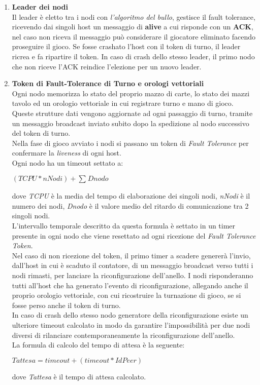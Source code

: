 \documentclass[10pt,a4paper]{article}
\begin{document}
\begin{enumerate}
\item \textbf{Leader dei nodi}\\ Il leader è eletto tra i nodi con \textit{l'algoritmo del bullo}, gestisce il fault tolerance, ricevendo dai singoli host un messaggio di \textbf{alive} a cui risponde con un \textbf{ACK}, nel caso non riceva il messaggio può considerare il giocatore eliminato facendo proseguire il gioco. Se fosse crashato l'host con il token di turno, il leader ricrea e fa ripartire il token. In caso di crash dello stesso leader, il primo nodo che non riceve l'ACK reindice l'elezione per un nuovo leader. 

\item \textbf{Token di Fault-Tolerance di Turno e orologi vettoriali}\\ Ogni nodo memorizza lo stato del proprio mazzo di carte, lo stato dei mazzi tavolo ed un orologio vettoriale in cui registrare turno e mano di gioco. Queste strutture dati vengono aggiornate ad ogni passaggio di turno, tramite un messaggio broadcast inviato subito dopo la spedizione al nodo successivo del token di turno.\\ Nella fase di gioco avviato i nodi si passano un token di \textit{Fault Tolerance} per confermare la \textit{liveness} di ogni host. \\ Ogni nodo ha un timeout settato a: \\\begin{center}$(TCPU*nNodi)+\sum_{}Dnodo$\end{center} dove \textit{TCPU} è la media del tempo di elaborazione dei singoli nodi, \textit{nNodi} è il numero dei nodi, \textit{Dnodo} è il valore medio del ritardo di comunicazione tra 2 singoli nodi.\\L'intervallo temporale descritto da questa formula è settato in un timer presente in ogni nodo che viene resettato ad ogni ricezione del \textit{Fault Tolerance Token}.\\ Nel caso di non ricezione del token, il primo timer a scadere genererà l'invio, dall'host in cui è scaduto il contatore, di un messaggio broadcast verso tutti i nodi rimasti, per lanciare la riconfigurazione dell'anello. I nodi risponderanno tutti all'host che ha generato l'evento di riconfigurazione, allegando anche il proprio orologio vettoriale, con cui ricostruire la turnazione di gioco, se si fosse perso anche il token di turno. \\ In caso di crash dello stesso nodo generatore della riconfigurazione esiste un ulteriore timeout calcolato in modo da garantire l'impossibilità per due nodi diversi di rilanciare contemporaneamente la riconfigurazione dell'anello.\\ La formula di calcolo del tempo di attesa è la seguente:\begin{center}$Tattesa = timeout +(timeout * IdPeer)$\end{center}dove \textit{Tattesa} è il tempo di attesa calcolato.\end{enumerate}
\end{document}

